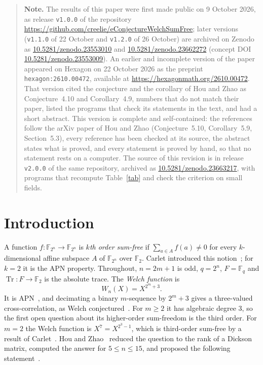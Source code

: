 \documentclass[11pt,a4paper,reqno]{amsart}
\theoremstyle{remark}
\numberwithin{equation}{section}
\newcommand{\F}{\mathbb{F}}
\newcommand{\Tr}{\operatorname{Tr}}
\begin{document}
\medskip
\begin{quote}
\small\sloppy
\noindent\textbf{Note.} The results of this paper were first made public on 9 October 2026, as release \texttt{v1.0.0} of the repository \url{https://github.com/creelie/eConjectureWelchSumFree}; later versions (\texttt{v1.1.0} of 22 October and \texttt{v1.2.0} of 26 October) are archived on Zenodo as \href{https://doi.org/10.5281/zenodo.23553010}{10.5281/zenodo.23553010} and \href{https://doi.org/10.5281/zenodo.23662272}{10.5281/zenodo.23662272} (concept DOI \href{https://doi.org/10.5281/zenodo.23553009}{10.5281/zenodo.23553009}). An earlier and incomplete version of the paper appeared on Hexagon on 22 October 2026 as the preprint \texttt{hexagon:2610.00472}, available at \url{https://hexagonmath.org/2610.00472}. That version cited the conjecture and the corollary of Hou and Zhao as Conjecture~4.10 and Corollary~4.9, numbers that do not match their paper, listed the programs that check its statements in the text, and had a short abstract. This version is complete and self-contained: the references follow the arXiv paper of Hou and Zhao (Conjecture~5.10, Corollary~5.9, Section~5.3), every reference has been checked at its source, the abstract states what is proved, and every statement is proved by hand, so that no statement rests on a computer. The source of this revision is in release \texttt{v2.0.0} of the same repository, archived as \href{https://doi.org/10.5281/zenodo.23663217}{10.5281/zenodo.23663217}, with programs that recompute Table~\ref{tab} and check the criterion on small fields.
\end{quote}

\section{Introduction}\label{sec:intro}

A function $f\colon\F_{2^n}\to\F_{2^n}$ is \emph{$k$th order sum-free} if $\sum_{a\in A}f(a)\ne0$ for every $k$-dimensional affine subspace $A$ of $\F_{2^n}$ over $\F_2$. Carlet introduced this notion~\cite{Carlet-JC,Carlet-DCC}; for $k=2$ it is the APN property. Throughout, $n=2m+1$ is odd, $q=2^n$, $F=\F_q$ and $\Tr\colon F\to\F_2$ is the absolute trace. The \emph{Welch function} is
\[
W_n(X)=X^{2^m+3}.
\]
It is APN~\cite{Dobbertin}, and decimating a binary $m$-sequence by $2^m+3$ gives a three-valued cross-correlation, as Welch conjectured~\cite{CCD}. For $m\ge2$ it has algebraic degree $3$, so the first open question about its higher-order sum-freedom is the third order. For $m=2$ the Welch function is $X^7=X^{2^3-1}$, which is third-order sum-free by a result of Carlet~\cite[Proposition~1]{Carlet-JC}. Hou and Zhao~\cite{HZ} reduced the question to the rank of a Dickson matrix, computed the answer for $5\le n\le15$, and proposed the following statement~\cite[Conjecture~5.10]{HZ}.
\end{document}
